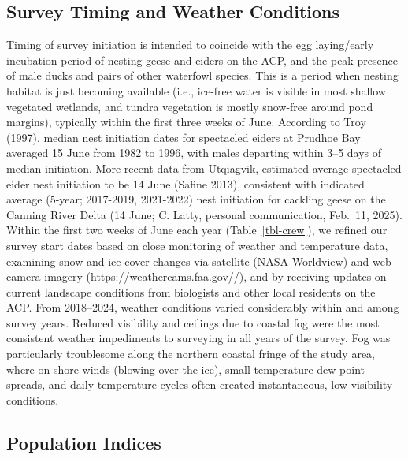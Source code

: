 \documentclass[
]{article}
\begin{document}
\endgroup{}

\subsection*{Survey Timing and Weather
Conditions}\label{survey-timing-and-weather-conditions}

Timing of survey initiation is intended to coincide with the egg
laying/early incubation period of nesting geese and eiders on the ACP,
and the peak presence of male ducks and pairs of other waterfowl
species. This is a period when nesting habitat is just becoming
available (i.e., ice-free water is visible in most shallow vegetated
wetlands, and tundra vegetation is mostly snow-free around pond
margins), typically within the first three weeks of June. According to
Troy (1997), median nest initiation dates for spectacled eiders at
Prudhoe Bay averaged 15 June from 1982 to 1996, with males departing
within 3--5 days of median initiation. More recent data from Utqiagvik,
estimated average spectacled eider nest initiation to be 14 June (Safine
2013), consistent with indicated average (5-year; 2017-2019, 2021-2022)
nest initiation for cackling geese on the Canning River Delta (14 June;
C. Latty, personal communication, Feb.~11, 2025). Within the first two
weeks of June each year (Table~\ref{tbl-crew}), we refined our survey
start dates based on close monitoring of weather and temperature data,
examining snow and ice-cover changes via satellite
(\href{https://worldview.earthdata.nasa.gov/}{NASA Worldview}) and
web-camera imagery (\url{https://weathercams.faa.gov//}), and by
receiving updates on current landscape conditions from biologists and
other local residents on the ACP. From 2018--2024, weather conditions
varied considerably within and among survey years. Reduced visibility
and ceilings due to coastal fog were the most consistent weather
impediments to surveying in all years of the survey. Fog was
particularly troublesome along the northern coastal fringe of the study
area, where on-shore winds (blowing over the ice), small temperature-dew
point spreads, and daily temperature cycles often created instantaneous,
low-visibility conditions.

\subsection*{Population Indices}\label{population-indices}
\end{document}
